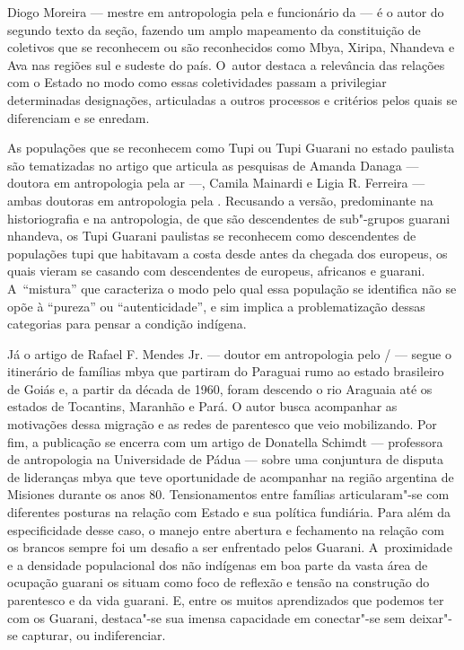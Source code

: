 Diogo Moreira --- mestre em antropologia pela  e funcionário da 
--- é o autor do segundo texto da seção, fazendo um amplo mapeamento da
constituição de coletivos que se reconhecem ou são reconhecidos como
Mbya, Xiripa, Nhandeva e Ava nas regiões sul e sudeste do país. O~autor
destaca a relevância das relações com o Estado no modo como essas
coletividades passam a privilegiar determinadas designações,
articuladas a outros processos e critérios pelos quais se diferenciam e
se enredam. 

As populações que se reconhecem como Tupi ou Tupi Guarani no estado
paulista são tematizadas no artigo que articula as pesquisas de Amanda
Danaga --- doutora em antropologia pela ar ---, Camila Mainardi e Ligia
R. Ferreira --- ambas doutoras em antropologia pela . Recusando a
versão, predominante na historiografia e na antropologia, de que são
descendentes de sub"-grupos guarani nhandeva, os Tupi Guarani paulistas
se reconhecem como descendentes de populações tupi que habitavam a
costa desde antes da chegada dos europeus, os quais vieram se casando
com descendentes de europeus, africanos e guarani. A~``mistura'' que
caracteriza o modo pelo qual essa população se identifica não se opõe à
``pureza'' ou ``autenticidade'', e sim implica a problematização dessas
categorias para pensar a condição indígena. 

Já o artigo de Rafael F. Mendes Jr. --- doutor em antropologia pelo
/ --- segue o itinerário de famílias mbya que partiram do Paraguai
rumo ao estado brasileiro de Goiás e, a partir da década de 1960, foram
descendo o rio Araguaia até os estados de Tocantins, Maranhão e Pará. O
autor busca acompanhar as motivações dessa migração e as redes de
parentesco que veio mobilizando. Por fim, a publicação se encerra com
um artigo de Donatella Schimdt --- professora de antropologia na
Universidade de Pádua --- sobre uma conjuntura de disputa de lideranças
mbya que teve oportunidade de acompanhar na região argentina de
Misiones durante os anos 80. Tensionamentos entre famílias
articularam"-se com diferentes posturas na relação com Estado e sua
política fundiária. Para além da especificidade desse caso, o manejo
entre abertura e fechamento na relação com os brancos sempre foi um
desafio a ser enfrentado pelos Guarani. A~proximidade e a densidade
populacional dos não indígenas em boa parte da vasta área de ocupação
guarani os situam como foco de reflexão e tensão na construção do
parentesco e da vida guarani. E, entre os muitos aprendizados que
podemos ter com os Guarani, destaca"-se sua imensa capacidade em
conectar"-se sem deixar"-se capturar, ou indiferenciar.

